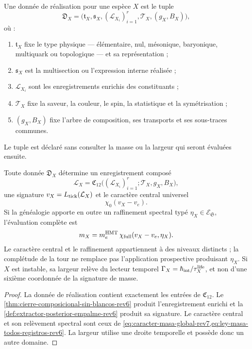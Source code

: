 \begin{definition}
\label{def:dato-realizacion-fisica-rev6} Une donnée de réalisation pour une espèce \(X\) est le tuple
\[
 \mathfrak D_X=
 \bigl(
 \mathfrak t_X,\mathfrak s_X,
 (\mathcal L_{X_i})_{i=1}^{r},
 \mathcal T_X,(g_X,B_X)
 \bigr),
\]
où :
\begin{enumerate}
 \item \(\mathfrak t_X\) fixe le type physique --- élémentaire, nul, mésonique, baryonique, multiquark ou topologique --- et sa représentation ;
 \item \(\mathfrak s_X\) est la multisection ou l’expression interne réalisée ;
 \item \(\mathcal L_{X_i}\) sont les enregistrements enrichis des constituants ;
 \item \(\mathcal T_X\) fixe la saveur, la couleur, le spin, la statistique et la symétrisation ;
 \item \((g_X,B_X)\) fixe l’arbre de composition, ses transports et ses sous-traces communes.
\end{enumerate}
Le tuple est déclaré sans consulter la masse ou la largeur qui seront évaluées ensuite.
\end{definition}

\begin{proposition}
\label{prop:realizacion-compuesta-ley-unica-rev6} Toute donnée \(\mathfrak D_X\) détermine un enregistrement composé
\[
 \mathcal L_X
 =\mathfrak C_{12}
   \bigl((\mathcal L_{X_i})_{i=1}^{r};
         \mathcal T_X,g_X,B_X\bigr),
\]
une signature \(v_X=L_{\rm tick}(\mathcal L_X)\) et le caractère central universel
\[
 \chi_0(v_X-v_e).
\]
Si la généalogie apporte en outre un raffinement spectral typé \(\eta_X\in\mathcal E_{\mathfrak S}\), l’évaluation complète est
\[
 m_X
 =m_e^{\rm HMT}\,
   \chi_{\rm full}(v_X-v_e,\eta_X).
\]
Le caractère central et le raffinement appartiennent à des niveaux distincts ; la complétude de la tour ne remplace pas l’application prospective produisant \(\eta_X\). Si \(X\) est instable, sa largeur relève du lecteur temporel \(\Gamma_X=\hbar_{\rm int}/\tau_X^{\rm life}\), et non d’une sixième coordonnée de la signature de masse.
\end{proposition}

\begin{proof}
La donnée de réalisation contient exactement les entrées de \(\mathfrak C_{12}\). Le \cref{thm:cierre-composicional-sin-blancos-rev6} produit l’enregistrement enrichi et la \cref{def:extractor-posterior-empalme-rev6} produit sa signature. Le caractère central et son relèvement spectral sont ceux de \cref{eq:caracter-masa-global-rev7,eq:ley-masa-todos-registros-rev6}. La largeur utilise une droite temporelle et possède donc un autre domaine.
\end{proof}

